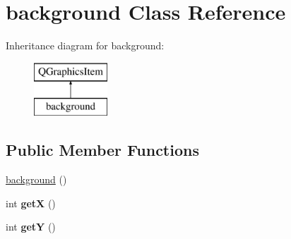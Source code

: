 \hypertarget{classbackground}{\section{background Class Reference}
\label{classbackground}
}
Inheritance diagram for background\-:\begin{figure}[H]
\begin{center}
\leavevmode
\includegraphics[height=2.000000cm]{classbackground}
\end{center}
\end{figure}
\subsection*{Public Member Functions}
\begin{DoxyCompactItemize}
\item 
\hyperlink{classbackground_a52499a7c34106266039b39b0f9b2dd1b}{background} ()
\item 
\hypertarget{classbackground_aa39a46a96bae7b2ce0d0431253f6845c}{int {\bfseries get\-X} ()}\label{classbackground_aa39a46a96bae7b2ce0d0431253f6845c}

\item 
\hypertarget{classbackground_a6761115f8a866946ae71cf4f06940536}{int {\bfseries get\-Y} ()}\label{classbackground_a6761115f8a866946ae71cf4f06940536}

\end{DoxyCompactItemize}
